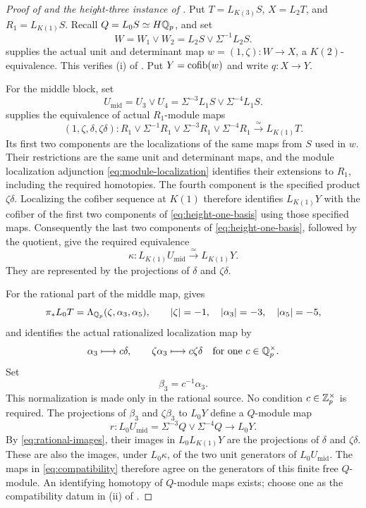 \begin{proof}[Proof of  and the height-three instance of
]
Put \(T=L_{K(3)}S\), \(X=L_2T\), and \(R_1=L_{K(1)}S\).
Recall \(Q=L_0S\simeq H\mathbb Q_p\), and set
\[
 W=W_1\vee W_2=L_2S\vee\Sigma^{-1}L_2S.
\]
 supplies the actual unit and determinant
map \(w=(1,\zeta):W\to X\), a \(K(2)\)-equivalence.  This verifies
\textup{(i)} of .  Put \(Y=\operatorname{cofib}(w)\) and
write \(q:X\to Y\).

For the middle block, set
\[
 U_{\mathrm{mid}}=U_3\vee U_4=\Sigma^{-3}L_1S\vee\Sigma^{-4}L_1S.
\]
 supplies the equivalence of actual
\(R_1\)-module maps
\begin{equation}\label{eq:height-one-basis}
 (1,\zeta,\delta,\zeta\delta):
 R_1\vee\Sigma^{-1}R_1\vee\Sigma^{-3}R_1\vee\Sigma^{-4}R_1
 \xrightarrow{\simeq}L_{K(1)}T.
\end{equation}
Its first two components are the localizations of the same maps from
\(S\) used in \(w\).  Their restrictions are the same unit and
determinant maps, and the module localization adjunction
\eqref{eq:module-localization} identifies their extensions to \(R_1\),
including the required homotopies.  The fourth component is the specified
product \(\zeta\delta\).  Localizing the cofiber sequence at \(K(1)\)
therefore identifies
\(L_{K(1)}Y\) with the cofiber of the first two components of
\eqref{eq:height-one-basis} using those specified maps.
Consequently the last two components of
\eqref{eq:height-one-basis}, followed by the quotient, give
the required equivalence
\begin{equation}\label{eq:kappa-application}
 \kappa:L_{K(1)}U_{\mathrm{mid}}\xrightarrow{\simeq}L_{K(1)}Y.
\end{equation}
They are represented by the projections of \(\delta\) and
\(\zeta\delta\).

For the rational part of the middle map,
 gives
\[
 \pi_*L_0T=\Lambda_{\mathbb Q_p}(\zeta,\alpha_3,\alpha_5),
 \qquad |\zeta|=-1,\quad|\alpha_3|=-3,\quad|\alpha_5|=-5,
\]
and identifies the actual rationalized localization map by
\begin{equation}\label{eq:rational-images}
 \alpha_3\longmapsto c\delta,\qquad
 \zeta\alpha_3\longmapsto c\zeta\delta
 \quad\text{for one }c\in\mathbb Q_p^\times.
\end{equation}
Set
\[
 \beta_3=c^{-1}\alpha_3.
\]
This normalization is made only in the rational source.
No condition \(c\in\mathbb Z_p^\times\) is required.
The projections of \(\beta_3\) and \(\zeta\beta_3\) to
\(L_0Y\) define a \(Q\)-module map
\[
 r:L_0U_{\mathrm{mid}}=\Sigma^{-3}Q\vee\Sigma^{-4}Q\longrightarrow L_0Y.
\]
By \eqref{eq:rational-images}, their images in
\(L_0L_{K(1)}Y\) are the projections of
\(\delta\) and \(\zeta\delta\).  These are also the images,
under \(L_0\kappa\), of the two unit generators of \(L_0U_{\mathrm{mid}}\).
The maps in \eqref{eq:compatibility} therefore agree on the
generators of this finite free \(Q\)-module.  An identifying
homotopy of \(Q\)-module maps exists; choose one as the
compatibility datum in \textup{(ii)} of .


\end{proof}

